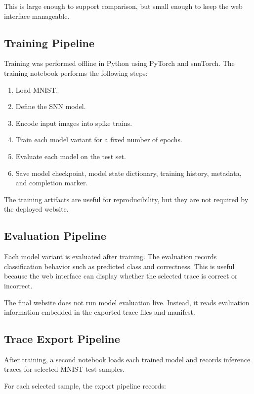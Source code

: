 \documentclass[11pt,a4paper]{article}
\begin{document}
This is large enough to support comparison, but small enough to keep the web interface manageable.

\subsection{Training Pipeline}

Training was performed offline in Python using PyTorch and snnTorch. The training notebook performs the following steps:

\begin{enumerate}
    \item Load MNIST.
    \item Define the SNN model.
    \item Encode input images into spike trains.
    \item Train each model variant for a fixed number of epochs.
    \item Evaluate each model on the test set.
    \item Save model checkpoint, model state dictionary, training history, metadata, and completion marker.
\end{enumerate}

The training artifacts are useful for reproducibility, but they are not required by the deployed website.

\subsection{Evaluation Pipeline}

Each model variant is evaluated after training. The evaluation records classification behavior such as predicted class and correctness. This is useful because the web interface can display whether the selected trace is correct or incorrect.

The final website does not run model evaluation live. Instead, it reads evaluation information embedded in the exported trace files and manifest.

\subsection{Trace Export Pipeline}

After training, a second notebook loads each trained model and records inference traces for selected MNIST test samples.

For each selected sample, the export pipeline records:
\end{document}
